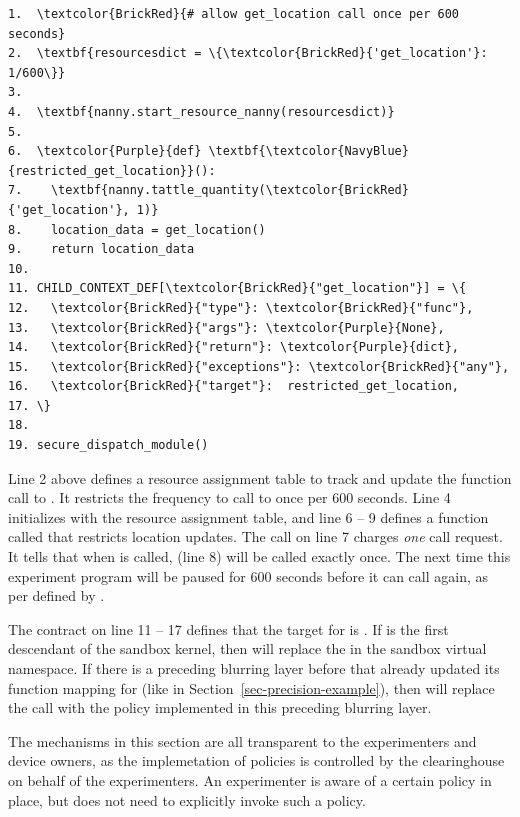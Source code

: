 \begin{Verbatim}
1.  \textcolor{BrickRed}{# allow get_location call once per 600 seconds}
2.  \textbf{resourcesdict = \{\textcolor{BrickRed}{'get_location'}: 1/600\}} 
3.
4.  \textbf{nanny.start_resource_nanny(resourcesdict)}
5.
6.  \textcolor{Purple}{def} \textbf{\textcolor{NavyBlue}{restricted_get_location}}():
7.    \textbf{nanny.tattle_quantity(\textcolor{BrickRed}{'get_location'}, 1)}
8.    location_data = get_location()
9.    return location_data
10.
11. CHILD_CONTEXT_DEF[\textcolor{BrickRed}{"get_location"}] = \{
12.   \textcolor{BrickRed}{"type"}: \textcolor{BrickRed}{"func"},
13.   \textcolor{BrickRed}{"args"}: \textcolor{Purple}{None},
14.   \textcolor{BrickRed}{"return"}: \textcolor{Purple}{dict},
15.   \textcolor{BrickRed}{"exceptions"}: \textcolor{BrickRed}{"any"},
16.   \textcolor{BrickRed}{"target"}:  restricted_get_location,
17. \}
18. 
19. secure_dispatch_module()
\end{Verbatim}

Line 2 above defines a resource assignment table  to track and update 
the function call to . It restricts the frequency to 
call  to once per 600 seconds. Line 4 initializes  
with the resource assignment table, and line 6 -- 9 defines a 
function called  that restricts location updates. 
The  call on line 7 charges \textit{one}  call 
request. It tells  that when  
is called,  (line 8) will be called exactly once. The
next time this experiment program 
will be paused for 600 seconds before it can call  again,
as per defined by .

The contract on line 11 -- 17 defines that the target
for  is . If 
 is the first descendant of the sandbox kernel, then
 will replace the 
in the sandbox virtual namespace. If there is a preceding blurring layer 
before  that already updated its 
function mapping for  (like   
in Section~\ref{sec-precision-example}), then
 will replace the  call
with the policy implemented in this preceding blurring layer.

\smallskip
The mechanisms in this section are all transparent to the experimenters 
and device owners, as the implemetation of policies is controlled by the 
clearinghouse on behalf of the experimenters. An experimenter is aware 
of a certain policy in place, but does not need to explicitly invoke such a 
policy. 
